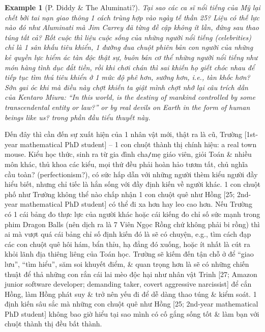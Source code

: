 \documentclass[12pt]{article}
\newtheorem{example}{Example}
\begin{document}
\begin{example}[P. Diddy \& The Aluminati?]
	Tại sao các ca sĩ nổi tiếng của Mỹ lại chết bởi tai nạn giao thông 1 cách trùng hợp vào ngày tế thần 25? Liệu có thế lực nào đó như Aluminati mà {\sc Jim Carrey} đã từng đề cập không ít lần, đứng sau thao túng tất cả? Rốt cuộc thì liệu cuộc sống của những người nổi tiếng (celebrities) chỉ là 1 sân khấu tiêu khiển, 1 đường đua chuột phiên bản con người của những kẻ quyền lực hiểm ác tàn độc thật sự, buôn bán cơ thể những người nổi tiếng như món hàng tình dục đắt tiền, rồi khi chơi chán thì sai khiến họ giết chóc nhau để tiếp tục tìm thú tiêu khiển ở 1 mức độ phê hơn, sướng hơn, i.e., tàn khốc hơn? Sởn gai óc khi mà điều này chợt khiến ta giật mình chợt nhớ lại câu trích dẫn của {\sc Kentaro Miura}: ``In this world, is the destiny of mankind controlled by some transcendental entity or law?'' or by real devils on Earth in the form of human beings like us? trong phần đầu tiểu thuyết này.
\end{example}
Đến đây thì cần đến sự xuất hiện của 1 nhân vật mới, thật ra là cũ, {\sf Trường [1st-year mathematical PhD student]} -- 1 con chuột thành thị chính hiệu: a real town mouse. Kiểu học thức, sinh ra từ gia đình cha{\tt/}mẹ giáo viên, giỏi Toán \& nhiều môn khác, thủ khoa các kiểu, mọi thứ đều phải hoàn hảo tươm tất, chủ nghĩa cầu toàn? (perfectionism?), có sức hấp dẫn với những người thèm kiểu người đầy hiểu biết, nhưng chỉ tiếc là hắn sống với đầy định kiến về người khác. 1 con chuột phố như Trường không thể nào chấp nhận 1 con chuột quê như {\sf Hồng [25; 2nd-year mathematical PhD student]} có thể đi xa hơn hay leo cao hơn. Nếu Trường có 1 cái bảng đo thực lực của người khác hoặc cái kiếng đo chỉ số sức mạnh trong phim Dragon Balls (nên dịch ra là 7 Viên Ngọc Rồng chứ không phải bi rồng) thì ai mà vượt quá cái bảng chỉ số định kiến đó là sẽ có chuyện, e.g., tìm cách đạp các con chuột quê hôi hám, bẩn thỉu, hạ đẳng đó xuống, hoặc ít nhất là cút ra khỏi lãnh địa thiêng liêng của Toán học. Trường sẽ kiếm đến tận chỗ ở để ``giao lưu'', ``tìm hiểu'', săm soi khuyết điểm, \& quan trọng hơn là sẽ có những chiến thuật để thả những con rắn cái lai mèo độc hại như nhân vật {\sf Trinh [27; Amazon junior software developer; demanding taker, covert aggressive narcissist]} để cắn Hồng, làm Hồng phát suy \& trở nên yếu đi để dễ dàng thao túng \& kiểm soát. 1 định kiến sâu sắc mà những con chuột quê như {\sf Hồng [25; 2nd-year mathematical PhD student]} không bao giờ hiểu tại sao mình có cố gắng sống tốt \& làm bạn với chuột thành thị đều bất thành.
\end{document}

